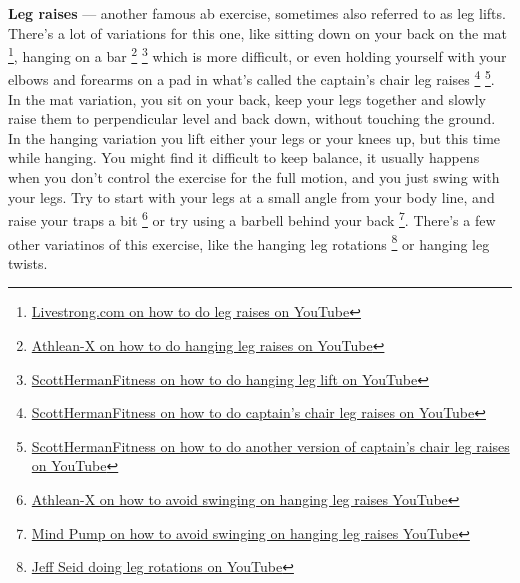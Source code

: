 \documentclass[openany, 12pt]{book}
\begin{document}
        \textbf{Leg raises}
        --- another famous ab exercise, sometimes also referred to as leg lifts. There's a lot of variations for this one, like sitting down on your back on the mat
        \footnote{\href{https://www.youtube.com/watch?v=JB2oyawG9KI}{Livestrong.com on how to do leg raises on YouTube}}, hanging on a bar
        \footnote{\href{https://www.youtube.com/watch?v=Pr1ieGZ5atk}{Athlean-X on how to do hanging leg raises on YouTube}}
        \footnote{\href{https://www.youtube.com/watch?v=hdng3Nm1x_E}{ScottHermanFitness on how to do hanging leg lift on YouTube}}
        which is more difficult, or even holding yourself with your elbows and forearms on a pad in what's called the captain's chair leg raises
        \footnote{\href{https://www.youtube.com/watch?v=ghwdoXHeiIk}{ScottHermanFitness on how to do captain's chair leg raises on YouTube}}
        \footnote{\href{https://www.youtube.com/watch?v=CU2-V80_JsA}{ScottHermanFitness on how to do another version of captain's chair leg raises on YouTube}}.
        In the mat variation, you sit on your back, keep your legs together and slowly raise them to perpendicular level and back down, without touching the ground.
        In the hanging variation you lift either your legs or your knees up, but this time while hanging. You might find it difficult to keep balance, it usually happens when you
        don't control the exercise for the full motion, and you just swing with your legs. Try to start with your legs at a small angle from your body line, and raise your traps a bit
        \footnote{\href{https://www.youtube.com/watch?v=7qPYYw3lPSA}{Athlean-X on how to avoid swinging on hanging leg raises YouTube}} or try using a barbell behind your back
        \footnote{\href{https://www.youtube.com/watch?v=0A4qGKbKMbE}{Mind Pump on how to avoid swinging on hanging leg raises YouTube}}. There's a few other variatinos of this exercise,
        like the hanging leg rotations
        \footnote{\href{https://www.youtube.com/watch?v=LtSbWD-Z9m8}{Jeff Seid doing leg rotations on YouTube}}
        or hanging leg twists.
\end{document}
